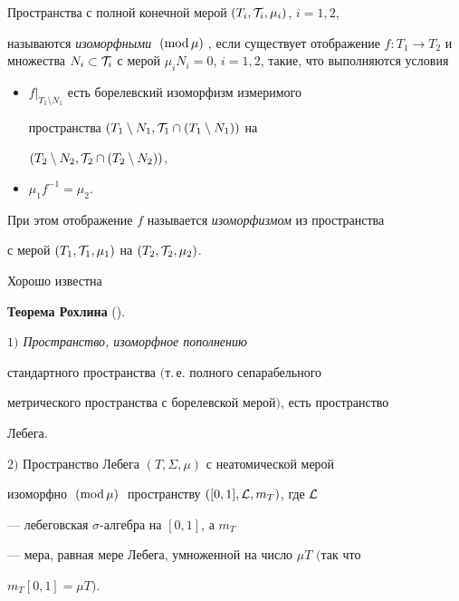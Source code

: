 \begin{defn}


Пространства с полной конечной мерой $(T_i,{\cal T}_i, \mu_i)$, $i=1,2$,


называются {\it изоморфными $\moddd$}, если существует отображение $f:T_1\to


T_2$ и множества $N_i\subset {\cal T}_i$ с мерой $\mu_i


N_i=0$, $i=1,2$, такие, что выполняются условия


\begin{itemize}


\item[a)] $f|_{T_1\setminus N_1}$ есть борелевский изоморфизм измеримого


пространства $(T_1\setminus N_1,{\cal T}_1\cap(T_1\setminus N_1))$ на


$(T_2\setminus N_2,{\cal T}_2\cap(T_2\setminus N_2))$,


\item[b)] $\mu_1f^{-1}=\mu_2$.


\end{itemize}


При этом отображение $f$ называется {\it изоморфизмом} из пространства


с мерой $(T_1,{\cal T}_1, \mu_1)$ на $(T_2,{\cal T}_2, \mu_2)$.


\end{defn}





Хорошо известна


\medskip





{\bf Теорема Рохлина} (\cite{28}).


{\it $1)$ Пространство, изоморфное пополнению


стандартного пространства $($т.\,е. полного сепарабельного


метрического пространства с борелевской мерой$)$, есть пространство


Лебега.





$2)$ Пространство Лебега $(T,\Sigma,\mu)$ с неатомической мерой


изоморфно $\;(\mathrm{mod}\,\mu)\;$ пространству $([0,1],{\cal L},m_T)$, где $\cal L$


--- лебеговская $\sigma$-ал\-геб\-ра на $[0,1]$, а $m_T$


--- мера, равная мере Лебега, умноженной на число $\mu T$ $($так что


$m_T[0,1]=\mu T)$.


}





